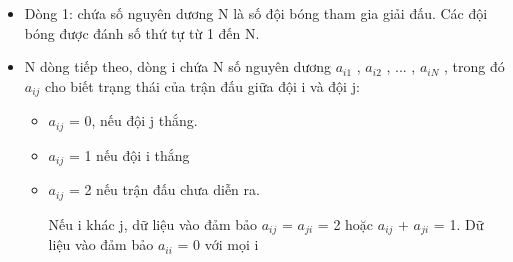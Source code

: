 \begin{itemize}
	\item     Dòng 1: chứa số nguyên dương N là số đội bóng tham gia giải đấu. Các đội bóng được đánh số thứ tự từ 1 đến N.   
	\item     N dòng tiếp theo, dòng i chứa N số nguyên dương $a_{i1}$    , $a_{i2}$    , ... , $a_{iN}$    , trong đó $a_{ij}$    cho biết trạng thái của trận đấu giữa đội i và đội j:    
\begin{itemize}
	\item       $a_{ij}$      = 0, nếu đội j thắng.     
	\item       $a_{ij}$      = 1 nếu đội i thắng     
	\item       $a_{ij}$      = 2 nếu trận đấu chưa diễn ra.      

       Nếu i khác j, dữ liệu vào đảm bảo $a_{ij}$       = $a_{ji}$       = 2 hoặc $a_{ij}$       + $a_{ji}$       = 1. Dữ liệu vào đảm bảo $a_{ii}$       = 0 với mọi i      
\end{itemize}
\end{itemize}